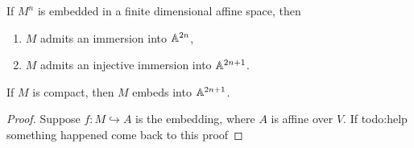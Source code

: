 \begin{theorem}
    If $M^n $ is embedded in a finite dimensional affine space, then 
    \begin{enumerate}[label=(\arabic*)]
        \item $M$ admits an immersion into $\mathbb{A}^{2n}$,
        \item $M$ admits an injective immersion into $\mathbb{A}^{2n+1}$.
    \end{enumerate}
\end{theorem}
\begin{cor}
   If $M$ is compact, then $M$ embeds into $\mathbb{A}^{2n+1}$. 
\end{cor}

\begin{proof}
    Suppose $f \colon M\hookrightarrow A$ is the embedding, where $A$ is affine over $V$. If {\color{red}todo:help something happened come back to this proof} 
\end{proof}

